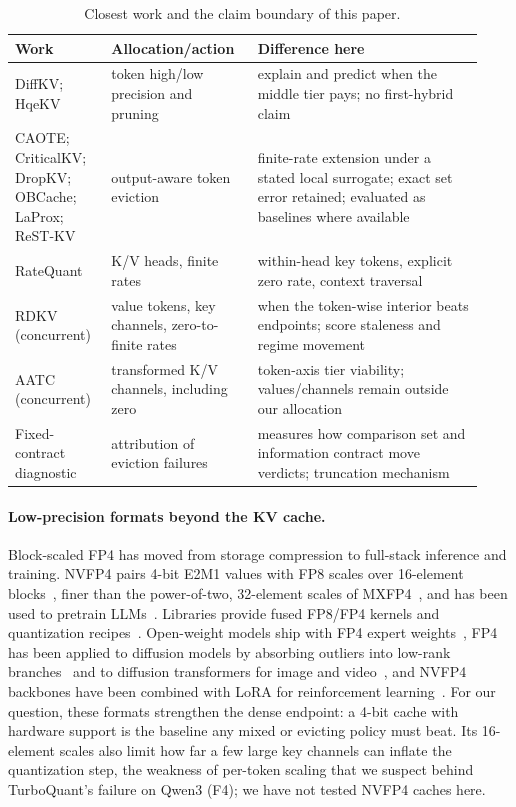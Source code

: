\begin{table}[h]
\centering
\footnotesize
\setlength{\tabcolsep}{3pt}
\caption{Closest work and the claim boundary of this paper.}
\label{tab:related}
\begin{tabular}{@{}p{0.19\linewidth}p{0.29\linewidth}p{0.45\linewidth}@{}}
\toprule
\textbf{Work} & \textbf{Allocation/action} & \textbf{Difference here} \\
\midrule
DiffKV; HqeKV & token high/low precision and pruning & explain and predict when the middle tier pays; no first-hybrid claim \\
CAOTE; CriticalKV; DropKV; OBCache; LaProx; ReST-KV & output-aware token eviction & finite-rate extension under a stated local surrogate; exact set error retained; evaluated as baselines where available \\
RateQuant & K/V heads, finite rates & within-head key tokens, explicit zero rate, context traversal \\
RDKV (concurrent) & value tokens, key channels, zero-to-finite rates & when the token-wise interior beats endpoints; score staleness and regime movement \\
AATC (concurrent) & transformed K/V channels, including zero & token-axis tier viability; values/channels remain outside our allocation \\
Fixed-contract diagnostic & attribution of eviction failures & measures how comparison set and information contract move verdicts; truncation mechanism \\
\bottomrule
\end{tabular}
\end{table}

\paragraph{Low-precision formats beyond the KV cache.}
Block-scaled FP4 has moved from storage compression to full-stack inference and
training.  NVFP4 pairs 4-bit E2M1 values with FP8 scales over 16-element
blocks~\citep{alvarez2025nvfp4,nvidia2025nvfp4ways}, finer than the
power-of-two, 32-element scales of MXFP4~\citep{ocp2023mx}, and has been used
to pretrain LLMs~\citep{nvidia2025nvfp4pretrain,devleker2025nvfp4train}.
Libraries provide fused FP8/FP4 kernels and quantization
recipes~\citep{nvidia2024te,nvidia2024modelopt}.  Open-weight models ship with
FP4 expert weights~\citep{openai2025gptoss,deepseek2026v4}, FP4 has been
applied to diffusion models by absorbing outliers into low-rank
branches~\citep{li2025svdquant} and to diffusion transformers for image and
video~\citep{zhao2024viditq}, and NVFP4 backbones have been combined with LoRA
for reinforcement learning~\citep{huang2025qerl}.  For our question, these
formats strengthen the dense endpoint: a 4-bit cache with hardware support is
the baseline any mixed or evicting policy must beat.  Its 16-element scales
also limit how far a few large key channels can inflate the quantization step,
the weakness of per-token scaling that we suspect behind TurboQuant's failure
on Qwen3 (F4); we have not tested NVFP4 caches here.

